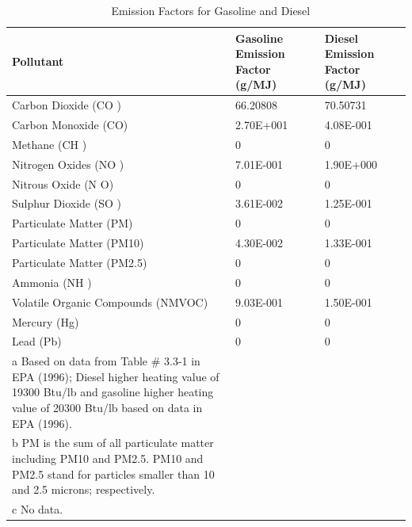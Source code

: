 \begin{longtable}[c]{p{3.0in}p{1.5in}p{1.5in}}
\caption{  Emission Factors for Gasoline and Diesel \protect \label{table:emission-factors-for-gasoline-and-diesel}}\\
\toprule 
Pollutant & Gasoline Emission Factor   (g/MJ) & Diesel Emission Factor   (g/MJ) \tabularnewline \midrule
\endhead
Carbon Dioxide (CO  ) & 66.20808 & 70.50731 \tabularnewline
Carbon Monoxide (CO) & 2.70E+001 & 4.08E-001 \tabularnewline
Methane (CH  ) & 0 & 0 \tabularnewline
Nitrogen Oxides (NO  ) & 7.01E-001 & 1.90E+000 \tabularnewline
Nitrous Oxide (N  O) & 0 & 0 \tabularnewline
Sulphur Dioxide (SO  ) & 3.61E-002 & 1.25E-001 \tabularnewline
Particulate Matter (PM) & 0 & 0 \tabularnewline
Particulate Matter (PM10) & 4.30E-002 & 1.33E-001 \tabularnewline
Particulate Matter (PM2.5) & 0 & 0 \tabularnewline
Ammonia (NH  ) & 0 & 0 \tabularnewline
Volatile Organic Compounds (NMVOC) & 9.03E-001 & 1.50E-001 \tabularnewline
Mercury (Hg) & 0 & 0 \tabularnewline
Lead (Pb) & 0 & 0 \tabularnewline
a Based on data from Table \# 3.3-1 in EPA (1996); Diesel higher heating value of 19300 Btu/lb and gasoline higher heating value of 20300 Btu/lb based on data in EPA (1996). \tabularnewline
b PM is the sum of all particulate matter including PM10 and PM2.5. PM10 and PM2.5 stand for particles smaller than 10 and 2.5 microns; respectively. \tabularnewline
c No data. \tabularnewline
\bottomrule
\end{longtable}

